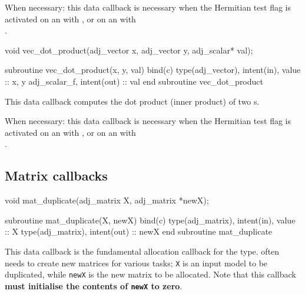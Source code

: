 When necessary: this data callback is necessary when the Hermitian test flag is
activated on an  with ,
or on an  with \\.

\begin{framed}
\begin{minipage}{\columnwidth}
\begin{ccode}
  void vec_dot_product(adj_vector x, adj_vector y, adj_scalar* val);
\end{ccode}
\begin{fortrancode}
  subroutine vec_dot_product(x, y, val) bind(c)
    type(adj_vector), intent(in), value :: x, y
    adj_scalar_f, intent(out) :: val
  end subroutine vec_dot_product
\end{fortrancode}
\end{minipage}
\end{framed}
This data callback computes the dot product (inner product) of two s.

When necessary: this data callback is necessary when the Hermitian test flag is
activated on an  with ,
or on an  with \\.

\subsection{Matrix callbacks} \label{sec:matrix_callbacks}
\begin{framed}
\begin{minipage}{\columnwidth}
\begin{ccode}
  void mat_duplicate(adj_matrix X, adj_matrix *newX);
\end{ccode}
\begin{fortrancode}
  subroutine mat_duplicate(X, newX) bind(c)
    type(adj_matrix), intent(in), value :: X
    type(adj_matrix), intent(out) :: newX
  end subroutine mat_duplicate
\end{fortrancode}
\end{minipage}
\end{framed}
This data callback is the fundamental allocation callback for the  type. \libadjoint
often needs to create new matrices for various tasks; \texttt{X} is an
input model  to be duplicated, while \texttt{newX} is the new matrix
to be allocated. Note that this callback \textbf{must initialise the contents of \texttt{newX} to zero}.

